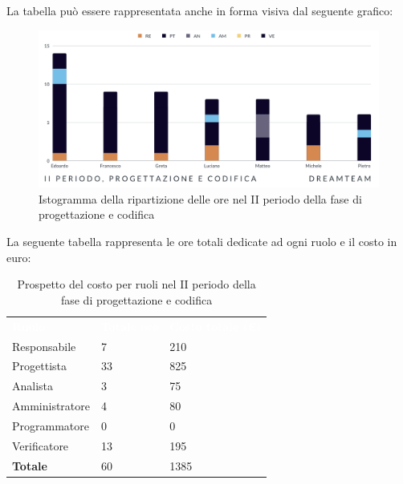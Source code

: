 La tabella può essere rappresentata anche in forma visiva dal seguente grafico:
\begin{figure}[H]
\centering
\includegraphics[scale=0.65]{Sezioni/SezioniPreventivo/grafici/Progettazione_codifica_II_periodo.png}
\caption{Istogramma della ripartizione delle ore nel II periodo della fase di progettazione e codifica}
\end{figure}

La seguente tabella rappresenta le ore totali dedicate ad ogni ruolo e il costo in euro:

\begin{table}[H]
\begin{center}
\renewcommand{\arraystretch}{1.5}
\begin{tabular}{ m{}<{\centering}  m{}<{\centering} m{}<{\centering}}
	\rowcolor{darkblue}
	\textcolor{white}{\textbf{Ruolo}}&\textcolor{white}{\textbf{Totale ore}}&\textcolor{white}{\textbf{Costo totale (\euro)}}\\ 

	Responsabile  & 7 & 210 \\	
	
	Progettista & 33 & 825 \\
	
	Analista & 3 & 75 \\

	Amministratore & 4 & 80 \\
	
	Programmatore & 0 & 0 \\
	
	Verificatore & 13 & 195 \\
	
	\textbf{Totale} & 60 & 1385 \\
	
\end{tabular}
\caption{Prospetto del costo per ruoli nel II periodo della fase di progettazione e codifica}
\end{center}
\end{table}


